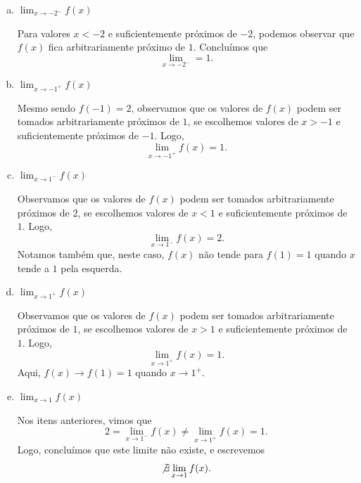 \begin{resol}
  \begin{enumerate}[a)]
  \item $\displaystyle \lim_{x\to -2^-} f(x)$

    Para valores $x<-2$ e suficientemente próximos de $-2$, podemos observar que $f(x)$ fica arbitrariamente próximo de $1$. Concluímos que
    \begin{equation}
      \lim_{x\to -2^-} = 1.
    \end{equation}

  \item $\displaystyle \lim_{x\to -1^+} f(x)$

    Mesmo sendo $f(-1)=2$, observamos que os valores de $f(x)$ podem ser tomados arbitrariamente próximos de $1$, se escolhemos valores de $x>-1$ e suficientemente próximos de $-1$. Logo,
    \begin{equation}
      \lim_{x\to -1^+} f(x) = 1.
    \end{equation}

  \item $\displaystyle \lim_{x\to 1^-} f(x)$

    Observamos que os valores de $f(x)$ podem ser tomados arbitrariamente próximos de $2$, se escolhemos valores de $x<1$ e suficientemente próximos de $1$. Logo,
    \begin{equation}
      \lim_{x\to 1^-} f(x) = 2.
    \end{equation}
    Notamos também que, neste caso, $f(x)$ não tende para $f(1)=1$ quando $x$ tende a $1$ pela esquerda.

  \item $\displaystyle \lim_{x\to 1^+} f(x)$

    Observamos que os valores de $f(x)$ podem ser tomados arbitrariamente próximos de $1$, se escolhemos valores de $x>1$ e suficientemente próximos de $1$. Logo,
    \begin{equation}
      \lim_{x\to 1^+} f(x) = 1.
    \end{equation}
    Aqui, $f(x)\to f(1)=1$ quando $x\to 1^+$.

    \item $\displaystyle \lim_{x\to 1} f(x)$

      Nos itens anteriores, vimos que
      \begin{equation}
        2 = \lim_{x\to 1^-} f(x) \neq \lim_{x\to 1^+} f(x) = 1.
      \end{equation}
      Logo, concluímos que este limite não existe, e escrevemos
      \begin{equation}
        \not\exists\lim_{x\to 1} f(x).
      \end{equation}
  \end{enumerate}
\end{resol}

